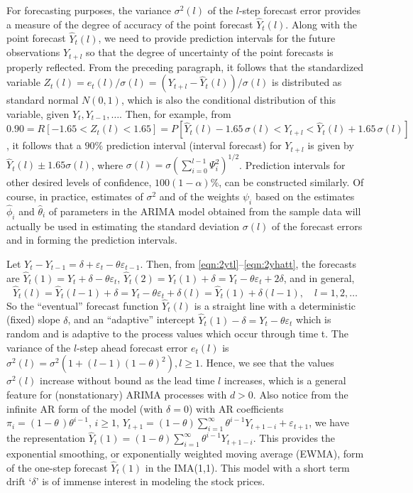 For forecasting purposes, the variance $\sigma^2(l)$ of the $l$-step forecast error provides a measure of the degree of accuracy of the point forecast $\hat{Y}_t(l)$. Along with the point forecast $\hat{Y}_t(l)$, we need to provide prediction intervals for the future observations $Y_{t+l}$ so that the degree of uncertainty of the point forecasts is properly reflected. From the preceding paragraph, it follows that the standardized variable $Z_t(l) = e_t(l) / \sigma(l)= ( Y_{t+l} - \hat{Y}_t(l) ) / \sigma(l)$ is distributed as standard normal $N(0,1)$, which is also the conditional distribution of this variable, given $Y_t, Y_{t-1}, \ldots$. Then, for example, from $0.90 = R[-1.65 < Z_t(l) < 1.65] = P[\hat{Y}_t(l) - 1.65\,\sigma(l) < Y_{t+l} < \hat{Y}_t(l) + 1.65\,\sigma(l)]$, it follows that a $90\%$ prediction interval (interval forecast) for $Y_{t+l}$ is given by $\hat{Y}_t(l) \pm 1.65 \sigma(l)$, where $\sigma(l) = \sigma( \sum_{i=0}^{l-1} \Psi_i^2 )^{1/2}$. Prediction intervals for other desired levels of confidence, $100(1 - \alpha)\%$, can be constructed similarly. Of course, in practice, estimates of $\sigma^2$ and of the weights $\psi_i$ based on the estimates $\hat{\phi}_i$ and $\hat{\theta}_i$ of parameters in the ARIMA model obtained from the sample data will actually be used in estimating the standard deviation $\sigma(l)$ of the forecast errors and in forming the prediction intervals. 


\begin{ex}
 Let $Y_t - Y_{t-1} = \delta + \varepsilon_t - \theta\varepsilon_{t-1}$. Then, from \eqref{eqn:2ytl}--\eqref{eqn:2yhatt}, the forecasts are $\hat{Y}_t(1) = Y_t + \delta -\theta\varepsilon_t$, $\hat{Y}_t(2) = Y_t(1) + \delta = Y_t -\theta\varepsilon_t + 2\delta$, and in general,
	\[
	\hat{Y}_t(l) = \hat{Y}_t(l-1) + \delta = Y_t - \theta\varepsilon_t + \delta(l) = \hat{Y}_t(1) + \delta(l-1),\quad l= 1, 2, \ldots
	\]
So the ``eventual'' forecast function $\hat{Y}_t(l)$ is a straight line with a deterministic (fixed) slope $\delta$, and an ``adaptive'' intercept $\hat{Y}_t(1) - \delta = Y_t - \theta \varepsilon_t$ which is random and is adaptive to the process values which occur through time t. The variance of the $l$-step ahead forecast error $e_t(l)$ is $\sigma^2(l) = \sigma^2 (1 + (l-1)(1-\theta)^2), l \geq1$. Hence, we see that the values $\sigma^2(l)$ increase without bound as the lead time $l$ increases, which is a general feature for (nonstationary) ARIMA processes with $d > 0$. Also notice from the infinite AR form of the model (with $\delta = 0$) with AR coefficients $\pi_i = (1-\theta\,)\theta^{i-1}$, $i \geq 1$, $Y_{t+1} = (1-\theta)\sum_{i=1}^\infty \theta^{i-1}Y_{t+1-i} + \varepsilon_{t+1}$, we have the representation $\hat{Y}_t(1) = (1-\theta)\sum_{i=1}^\infty \theta^{i-1} Y_{t+1-i}$. This provides the exponential smoothing, or exponentially weighted moving average (EWMA), form of the one-step forecast $\hat{Y}_t(1)$ in the IMA(1,1). This model with a short term drift `$\delta$' is of immense interest in modeling the stock prices. \xqed
\end{ex}



